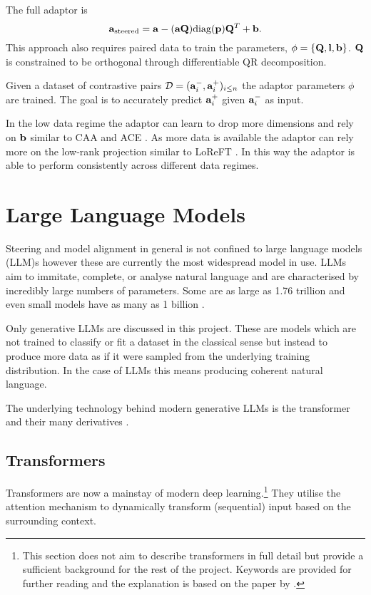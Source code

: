 The full adaptor is
\begin{equation}
    \mathbf{a}_\text{steered} = \mathbf{a} - (\mathbf{a}\mathbf{Q})\text{diag}(\mathbf{p})\mathbf{Q}^T + \mathbf{b}.
\end{equation}
This approach also requires paired data to train the parameters, $\phi = \{\mathbf{Q}, \mathbf{l}, \mathbf{b}\}$.
$\mathbf{Q}$ is constrained to be orthogonal through differentiable QR decomposition.

Given a dataset of contrastive pairs $\mathcal{D} = (\mathbf{a}_i^-, \mathbf{a}_i^+)_{i\le n}$ the adaptor parameters $\phi$ are trained.
The goal is to accurately predict $\mathbf{a}_i^+$ given $\mathbf{a}_i^-$ as input.

In the low data regime the adaptor can learn to drop more dimensions and rely on $\mathbf{b}$ similar to CAA \citep{caa} and ACE \citep{ace}.
As more data is available the adaptor can rely more on the low-rank projection similar to LoReFT \citep{reft}.
In this way the adaptor is able to perform consistently across different data regimes.

\section{Large Language Models}

Steering and model alignment in general is not confined to large language models (LLM)s however these are currently the most widespread model in use.
LLMs aim to immitate, complete, or analyse natural language and are characterised by incredibly large numbers of parameters.
Some are as large as 1.76 trillion \citep{gpt4-count} and even small models have as many as 1 billion \citep{gemma}.

Only generative LLMs are discussed in this project.
These are models which are not trained to classify or fit a dataset in the classical sense but instead to produce more data as if it were sampled from the underlying training distribution.
In the case of LLMs this means producing coherent natural language.

The underlying technology behind modern generative LLMs is the transformer \citep{transformers} and their many derivatives \citep{linear-attention, bigbird, linformer}.

\subsection{Transformers}

Transformers \citep{transformers} are now a mainstay of modern deep learning.\footnote{This section does not aim to describe transformers in full detail but provide a sufficient background for the rest of the project.
Keywords are provided for further reading and the explanation is based on the paper by \citet{turner2023}.}
They utilise the attention mechanism to dynamically transform (sequential) input based on the surrounding context.

